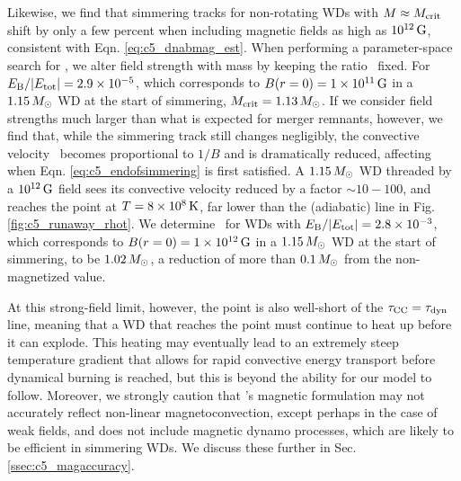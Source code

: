 Likewise, we find that simmering tracks for non-rotating WDs with $M\approx\Mcrit$ shift by only a few percent when including magnetic fields as high as $10^{12}\,\mathrm{G}$, consistent with Eqn. \ref{eq:c5_dnabmag_est}.  When performing a parameter-space search for \Mcrit, we alter field strength with mass by keeping the ratio \EBEtot\ fixed.  For $\EBEtot = 2.9\times10^{-5}$, which corresponds to $B(r=0) = 1\times10^{11}\,\mathrm{G}$ in a $1.15\,\Msun$ WD at the start of simmering, $\Mcrit = 1.13\,\Msun$.  If we consider field strengths much larger than what is expected for merger remnants, however, we find that, while the simmering track still changes negligibly, the convective velocity \vconv\ becomes proportional to $1/B$ and is dramatically reduced, affecting when Eqn. \ref{eq:c5_endofsimmering} is first satisfied.  A $1.15\,\Msun$ WD threaded by a $10^{12}\,\mathrm{G}$ field sees its convective velocity reduced by a factor $\sim 10 - 100$, and reaches the \citeal{wooswk04} point at $T = 8\times10^8\,\mathrm{K}$, far lower than the (adiabatic) \citeal{wooswk04} line in Fig. \ref{fig:c5_runaway_rhot}.  We determine \Mcrit\ for WDs with $\EBEtot = 2.8\times10^{-3}$, which corresponds to $B(r=0) = 1\times10^{12}\,\mathrm{G}$ in a $1.15\,\Msun$ WD at the start of simmering, to be $1.02\,\Msun$, a reduction of more than $0.1\,\Msun$ from the non-magnetized value.

At this strong-field limit, however, the \citeal{wooswk04} point is also well-short of the $\taucc = \taudyn$ line, meaning that a WD that reaches the point must continue to heat up before it can explode.  This heating may eventually lead to an extremely steep temperature gradient that allows for rapid convective energy transport before dynamical burning is reached, but this is beyond the ability for our model to follow.  Moreover, we strongly caution that \citeal{stev79}'s magnetic formulation may not accurately reflect non-linear magnetoconvection, except perhaps in the case of weak fields, and does not include magnetic dynamo processes, which are likely to be efficient in simmering WDs.  We discuss these further in Sec. \ref{ssec:c5_magaccuracy}.





